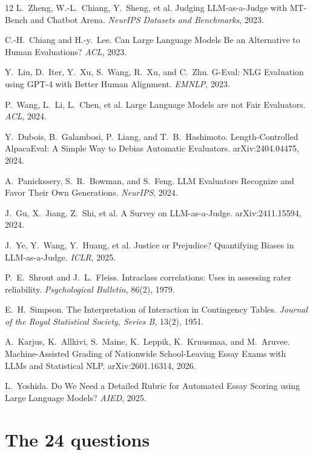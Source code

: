 \documentclass{article}
\begin{document}
\begin{thebibliography}{12}
\small
{} L.~Zheng, W.-L.~Chiang, Y.~Sheng, et al.
Judging LLM-as-a-Judge with MT-Bench and Chatbot Arena.
\emph{NeurIPS Datasets and Benchmarks}, 2023.

 C.-H.~Chiang and H.-y.~Lee.
Can Large Language Models Be an Alternative to Human Evaluations?
\emph{ACL}, 2023.

 Y.~Liu, D.~Iter, Y.~Xu, S.~Wang, R.~Xu, and C.~Zhu.
G-Eval: NLG Evaluation using GPT-4 with Better Human Alignment.
\emph{EMNLP}, 2023.

 P.~Wang, L.~Li, L.~Chen, et al.
Large Language Models are not Fair Evaluators.
\emph{ACL}, 2024.

 Y.~Dubois, B.~Galambosi, P.~Liang, and T.~B.~Hashimoto.
Length-Controlled AlpacaEval: A Simple Way to Debias Automatic Evaluators.
arXiv:2404.04475, 2024.

 A.~Panickssery, S.~R.~Bowman, and S.~Feng.
LLM Evaluators Recognize and Favor Their Own Generations.
\emph{NeurIPS}, 2024.

 J.~Gu, X.~Jiang, Z.~Shi, et al.
A Survey on LLM-as-a-Judge. arXiv:2411.15594, 2024.

 J.~Ye, Y.~Wang, Y.~Huang, et al.
Justice or Prejudice? Quantifying Biases in LLM-as-a-Judge.
\emph{ICLR}, 2025.

 P.~E.~Shrout and J.~L.~Fleiss.
Intraclass correlations: Uses in assessing rater reliability.
\emph{Psychological Bulletin}, 86(2), 1979.

 E.~H.~Simpson.
The Interpretation of Interaction in Contingency Tables.
\emph{Journal of the Royal Statistical Society, Series B}, 13(2), 1951.

 A.~Karjus, K.~Allkivi, S.~Maine, K.~Leppik,
K.~Kruusmaa, and M.~Aruvee.
Machine-Assisted Grading of Nationwide School-Leaving Essay Exams with LLMs
and Statistical NLP. arXiv:2601.16314, 2026.

 L.~Yoshida.
Do We Need a Detailed Rubric for Automated Essay Scoring using Large
Language Models? \emph{AIED}, 2025.
\end{thebibliography}

\appendix

\section{The 24 questions}
\label{app:questions}
\end{document}
